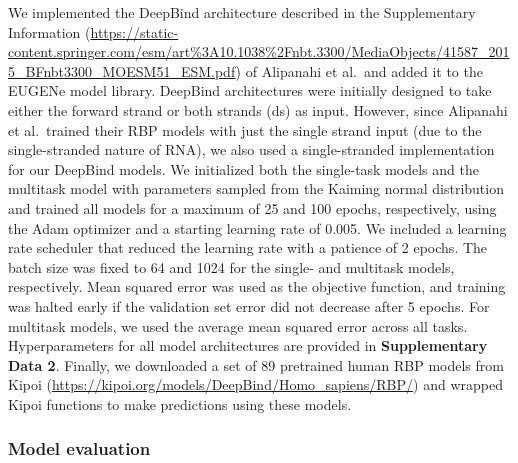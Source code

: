 We implemented the DeepBind architecture described in the Supplementary Information (\url{https://static-content.springer.com/esm/art%3A10.1038%2Fnbt.3300/MediaObjects/41587_2015_BFnbt3300_MOESM51_ESM.pdf}) of Alipanahi et al.\ and added it to the EUGENe model library. DeepBind architectures were initially designed to take either the forward strand or both strands (ds) as input. However, since Alipanahi et al.\ trained their RBP models with just the single strand input (due to the single-stranded nature of RNA), we also used a single-stranded implementation for our DeepBind models. We initialized both the single-task models and the multitask model with parameters sampled from the Kaiming normal distribution\cite{He2015-qh} and trained all models for a maximum of 25 and 100 epochs, respectively, using the Adam optimizer\cite{Kingma2014-kn} and a starting learning rate of 0.005. We included a learning rate scheduler that reduced the learning rate with a patience of 2 epochs. The batch size was fixed to 64 and 1024 for the single- and multitask models, respectively. Mean squared error was used as the objective function, and training was halted early if the validation set error did not decrease after 5 epochs. For multitask models, we used the average mean squared error across all tasks. Hyperparameters for all model architectures are provided in \textbf{Supplementary Data 2}. Finally, we downloaded a set of 89 pretrained human RBP models from Kipoi (\url{https://kipoi.org/models/DeepBind/Homo_sapiens/RBP/}) and wrapped Kipoi functions to make predictions using these models.

\subsubsection{Model evaluation}

